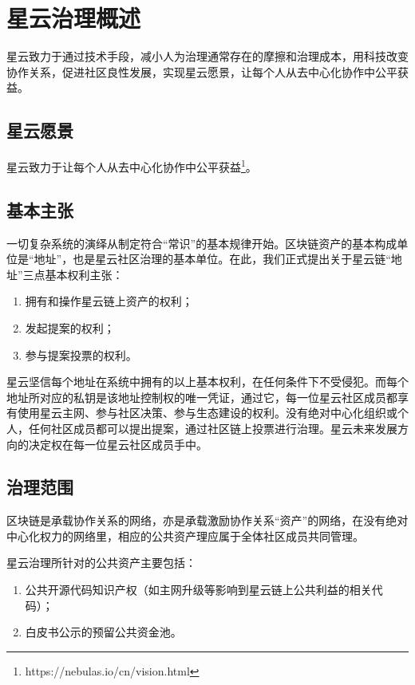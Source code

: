 \section{星云治理概述}
星云致力于通过技术手段，减小人为治理通常存在的摩擦和治理成本，用科技改变协作关系，促进社区良性发展，实现星云愿景，让每个人从去中心化协作中公平获益。

\subsection{星云愿景}
星云致力于让每个人从去中心化协作中公平获益\footnote{https://nebulas.io/cn/vision.html}。

\subsection{基本主张}
一切复杂系统的演绎从制定符合“常识”的基本规律开始。区块链资产的基本构成单位是“地址”，也是星云社区治理的基本单位。在此，我们正式提出关于星云链“地址”三点基本权利主张：
\begin{enumerate}
	\item 拥有和操作星云链上资产的权利；
	\item 发起提案的权利；
	\item 参与提案投票的权利。
\end{enumerate}
星云坚信每个地址在系统中拥有的以上基本权利，在任何条件下不受侵犯。而每个地址所对应的私钥是该地址控制权的唯一凭证，通过它，每一位星云社区成员都享有使用星云主网、参与社区决策、参与生态建设的权利。没有绝对中心化组织或个人，任何社区成员都可以提出提案，通过社区链上投票进行治理。星云未来发展方向的决定权在每一位星云社区成员手中。

\subsection{治理范围}
区块链是承载协作关系的网络，亦是承载激励协作关系“资产”的网络，在没有绝对中心化权力的网络里，相应的公共资产理应属于全体社区成员共同管理。

星云治理所针对的公共资产主要包括：
\begin{enumerate}
	\item 公共开源代码知识产权（如主网升级等影响到星云链上公共利益的相关代码）；
	\item 白皮书公示的预留公共资金池。
\end{enumerate}


